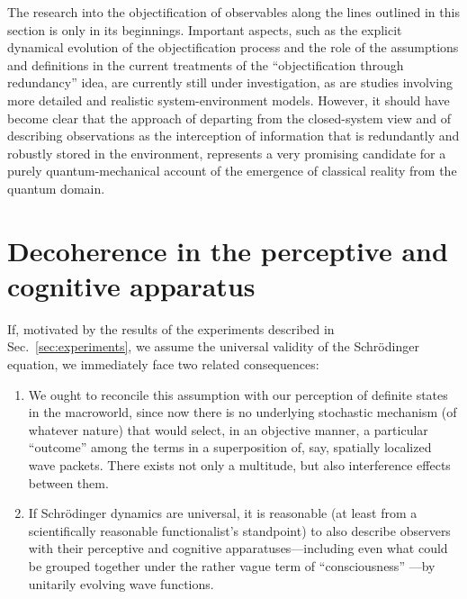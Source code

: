 \documentclass[twocolumn,aps,floatfix,amsmath,amssymb,showpacs,nofootinbib]{revtex4}
\newcommand{\bn}{\begin{enumerate}} \newcommand{\en}{\end{enumerate}}
\begin{document}
The research into the objectification of observables along the lines
outlined in this section is only in its beginnings. Important aspects,
such as the explicit dynamical evolution of the objectification
process \cite{Ollivier:2004:im} and the role of the assumptions and
definitions in the current treatments of the ``objectification through
redundancy'' idea, are currently still under investigation, as are
studies involving more detailed and realistic system-environment
models.  However, it should have become clear that the approach of
departing from the closed-system view and of describing observations
as the interception of information that is redundantly and robustly
stored in the environment, represents a very promising candidate for a
purely quantum-mechanical account of the emergence of classical
reality from the quantum domain.


\section{Decoherence in the perceptive and cognitive apparatus} \label{sec:brain}

If, motivated by the results of the experiments described in
Sec.~\ref{sec:experiments}, we assume the universal validity of the
Schr\"odinger equation, we immediately face two related consequences:

\bn

\item We ought to reconcile this assumption with our perception
  of definite states in the macroworld, since now there is no
  underlying stochastic mechanism (of whatever nature) that would
  select, in an objective manner, a particular ``outcome'' among the
  terms in a superposition of, say, spatially localized wave packets.
  There exists not only a multitude, but also interference effects
  between them.
  
\item If Schr\"odinger dynamics are universal, it is reasonable
  (at least from a scientifically reasonable functionalist's
  standpoint) to also describe observers with their perceptive and
  cognitive apparatuses---including even what could be grouped
  together under the rather vague term of ``consciousness''
  \cite{Neumann:1932:gq,Wigner:1962:iu,Stapp:1993:mm,Zeh:2000:rr}---by
  unitarily evolving wave functions.

\en
\end{document}
